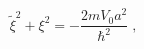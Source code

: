 \begin{equation}
\tilde{\xi}^2
+ \xi^{2} 
= - \frac{2 mV_{0} a^{2} }{ \hbar^{2}}
\; ,
\label{eq:pythagorean}
\end{equation}

